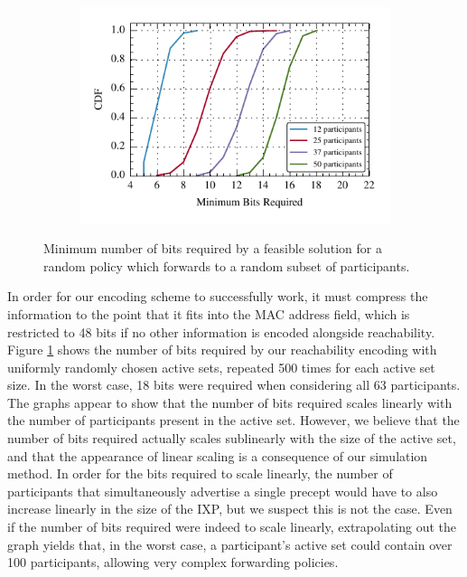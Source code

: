 \begin{figure}[t!] 
\begin{minipage}{1\linewidth}
\begin{subfigure}[b]{0.96\linewidth}
\includegraphics[width=\linewidth]{figures/bit_counts}
\end{subfigure} 
\end{minipage} 
\caption{Minimum number of bits required by a feasible solution for a random policy which forwards to a random subset of participants.}
\label{fig:bits}
\end{figure}

In order for our encoding scheme to successfully work, it must compress the information to the point that it fits into the MAC address field, which is restricted to 48 bits if no other information is encoded alongside reachability. Figure \ref{fig:bits} shows the number of bits required by our reachability encoding with uniformly randomly chosen active sets, repeated 500 times for each active set size. In the worst case, 18 bits were required when considering all 63 participants. The graphs appear to show that the number of bits required scales linearly with the number of participants present in the active set. However, we believe that the number of bits required actually scales sublinearly with the size of the active set, and that the appearance of linear scaling is a consequence of our simulation method. In order for the bits required to scale linearly, the number of participants that simultaneously advertise a single precept would have to also increase linearly in the size of the IXP, but we suspect this is not the case. Even if the number of bits required were indeed to scale linearly, extrapolating out the graph yields that, in the worst case, a participant's active set could contain over 100 participants, allowing very complex forwarding policies.


